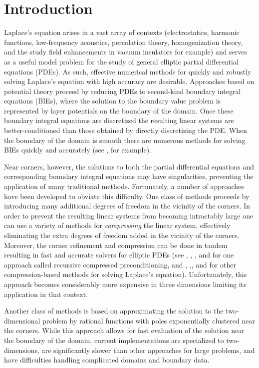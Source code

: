 \section{Introduction}
Laplace's equation arises in a vast array of contexts (electrostatics, harmonic functions, low-frequency acoustics, percolation theory, homogenization theory, and the study field enhancements in vacuum insulators for example) and serves as a useful model problem for the study of general elliptic partial differential equations (PDEs). As such, effective numerical methods for quickly and robustly solving Laplace's equation with high accuracy are desirable. Approaches based on potential theory proceed by reducing PDEs to second-kind boundary integral equations (BIEs), where the solution to the boundary value problem is represented by layer potentials on the boundary of the domain. Once these boundary integral equations are discretized the resulting linear systems are better-conditioned than those obtained by directly discretizing the PDE. When the boundary of the domain is smooth there are numerous methods for solving BIEs quickly and accurately (see \cite{hao}, for example). 

Near corners, however, the solutions to both the partial differential equations and corresponding boundary integral equations may have singularities, preventing the application of many traditional methods. Fortunately, a number of approaches have been developed to obviate this difficulty. One class of methods proceeds by introducing many additional degrees of freedom in the vicinity of the corners. In order to prevent the resulting linear systems from becoming intractably large one can use a variety of methods for {\it compressing} the linear system, effectively eliminating the extra degrees of freedom added in the vicinity of the corners. Moreover, the corner refinement and compression can be done in tandem resulting in fast and accurate solvers for elliptic PDEs (see \cite{helsing}, \cite{helsing2},  \cite{ojala}, \cite{helsjcp} and \cite{helsinv}  for  one approach called recursive compressed preconditioning, and  \cite{gillman}, \cite{bremer},\cite{bremer2}, and \cite{bremer3}  for other compression-based methods for solving Laplace's equation). Unfortunately, this approach becomes considerably more expensive in three dimensions limiting its application in that context.

 Another class of methods is based on approximating the solution to the two-dimensional problem by rational functions \cite{} with poles exponentially clustered near the corners. While this approach allows for fast evaluation of the solution near the boundary of the domain, current implementations are specialized to two-dimensions, are significantly slower than other approaches for large problems, and have difficulties handling complicated domains and boundary data.
 
